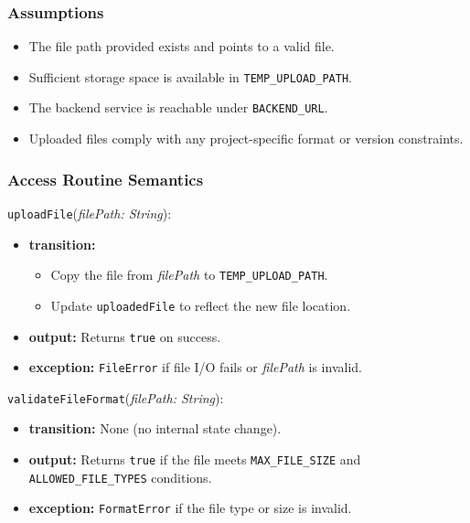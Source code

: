 \documentclass[12pt, titlepage]{article}
\begin{document}
\subsubsection{Assumptions}

\begin{itemize}
    \item The file path provided exists and points to a valid file.
    \item Sufficient storage space is available in \texttt{TEMP\_UPLOAD\_PATH}.
    \item The backend service is reachable under \texttt{BACKEND\_URL}.
    \item Uploaded files comply with any project-specific format or version constraints.
\end{itemize}

\subsubsection{Access Routine Semantics}

\noindent \texttt{uploadFile}(\textit{filePath: String}):
\begin{itemize}
    \item \textbf{transition:} 
    \begin{itemize}
        \item Copy the file from \textit{filePath} to \texttt{TEMP\_UPLOAD\_PATH}.
        \item Update \texttt{uploadedFile} to reflect the new file location.
    \end{itemize}
    \item \textbf{output:} Returns \texttt{true} on success.
    \item \textbf{exception:} \texttt{FileError} if file I/O fails or \textit{filePath} is invalid.
\end{itemize}

\noindent \texttt{validateFileFormat}(\textit{filePath: String}):
\begin{itemize}
    \item \textbf{transition:} None (no internal state change).
    \item \textbf{output:} Returns \texttt{true} if the file meets \texttt{MAX\_FILE\_SIZE} and 
    \texttt{ALLOWED\_FILE\_TYPES} conditions.
    \item \textbf{exception:} \texttt{FormatError} if the file type or size is invalid.
\end{itemize}
\end{document}
